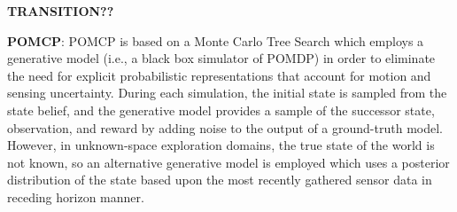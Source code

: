 \documentclass{article}
\newcommand{\ph}[1]{{\textbf{#1}:}} %
\begin{document}
\textbf{TRANSITION??}

\ph{POMCP}
POMCP \cite{silver2010monte} is based on a Monte Carlo Tree Search which employs a generative model (i.e., a black box simulator of POMDP) in order to eliminate the need for explicit probabilistic representations that account for motion and sensing uncertainty. During each simulation, the initial state is sampled from the state belief, and the generative model provides a sample of the successor state, observation, and reward by adding noise to the output of a ground-truth model. However, in unknown-space exploration domains, the true state of the world is not known, so an alternative generative model is employed which uses a posterior distribution of the state based upon the most recently gathered sensor data in receding horizon manner. 








\end{document}
